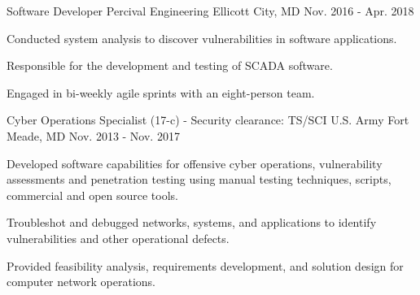 \begin{cventries}
  \cventry
    {Software Developer} %
    {Percival Engineering} %
    {Ellicott City, MD} %
    {Nov. 2016 - Apr. 2018} %
    {
      \begin{cvitems} %
        \item {Conducted system analysis to discover vulnerabilities in software applications.}
        \item {Responsible for the development and testing of SCADA software.}
        \item {Engaged in bi-weekly agile sprints with an eight-person team.}
      \end{cvitems}
    }

  \cventry
    {Cyber Operations Specialist (17-c) - Security clearance:  TS/SCI} %
    {U.S. Army} %
    {Fort Meade, MD} %
    {Nov. 2013 - Nov. 2017} %
    {
      \begin{cvitems} %
        \item {Developed software capabilities for offensive cyber operations, vulnerability assessments and penetration testing using manual testing techniques, scripts, commercial and open source tools.}
        \item {Troubleshot and debugged networks, systems, and applications to identify vulnerabilities and other operational defects.}
        \item {Provided feasibility analysis, requirements development, and solution design for computer network operations.}
      \end{cvitems}
    }

\end{cventries}
